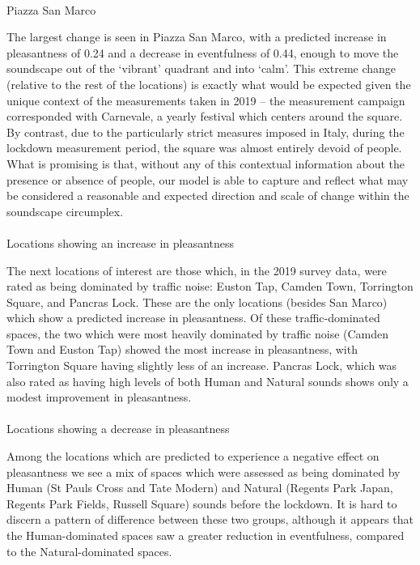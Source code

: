 \documentclass[
  authoryear,
  preprint,
  3p,
  onecolumn]{elsarticle}
\makeatletter
\let\oldparagraph\paragraph
\renewcommand{\paragraph}{
    \@ifstar
      \xxxParagraphStar
      \xxxParagraphNoStar
  }
\newcommand{\xxxParagraphStar}[1]{\oldparagraph*{#1}\mbox{}}
\newcommand{\xxxParagraphNoStar}[1]{\oldparagraph{#1}\mbox{}}
\makeatother
\begin{document}
\paragraph{Piazza San Marco}\label{piazza-san-marco}

The largest change is seen in Piazza San Marco, with a predicted
increase in pleasantness of 0.24 and a decrease in eventfulness of 0.44,
enough to move the soundscape out of the `vibrant' quadrant and into
`calm'. This extreme change (relative to the rest of the locations) is
exactly what would be expected given the unique context of the
measurements taken in 2019 -- the measurement campaign corresponded with
Carnevale, a yearly festival which centers around the square. By
contrast, due to the particularly strict measures imposed in Italy,
during the lockdown measurement period, the square was almost entirely
devoid of people. What is promising is that, without any of this
contextual information about the presence or absence of people, our
model is able to capture and reflect what may be considered a reasonable
and expected direction and scale of change within the soundscape
circumplex.

\paragraph{Locations showing an increase in
pleasantness}\label{locations-showing-an-increase-in-pleasantness}

The next locations of interest are those which, in the 2019 survey data,
were rated as being dominated by traffic noise: Euston Tap, Camden Town,
Torrington Square, and Pancras Lock. These are the only locations
(besides San Marco) which show a predicted increase in pleasantness. Of
these traffic-dominated spaces, the two which were most heavily
dominated by traffic noise (Camden Town and Euston Tap) showed the most
increase in pleasantness, with Torrington Square having slightly less of
an increase. Pancras Lock, which was also rated as having high levels of
both Human and Natural sounds shows only a modest improvement in
pleasantness.

\paragraph{Locations showing a decrease in
pleasantness}\label{locations-showing-a-decrease-in-pleasantness}

Among the locations which are predicted to experience a negative effect
on pleasantness we see a mix of spaces which were assessed as being
dominated by Human (St Pauls Cross and Tate Modern) and Natural (Regents
Park Japan, Regents Park Fields, Russell Square) sounds before the
lockdown. It is hard to discern a pattern of difference between these
two groups, although it appears that the Human-dominated spaces saw a
greater reduction in eventfulness, compared to the Natural-dominated
spaces.
\end{document}
